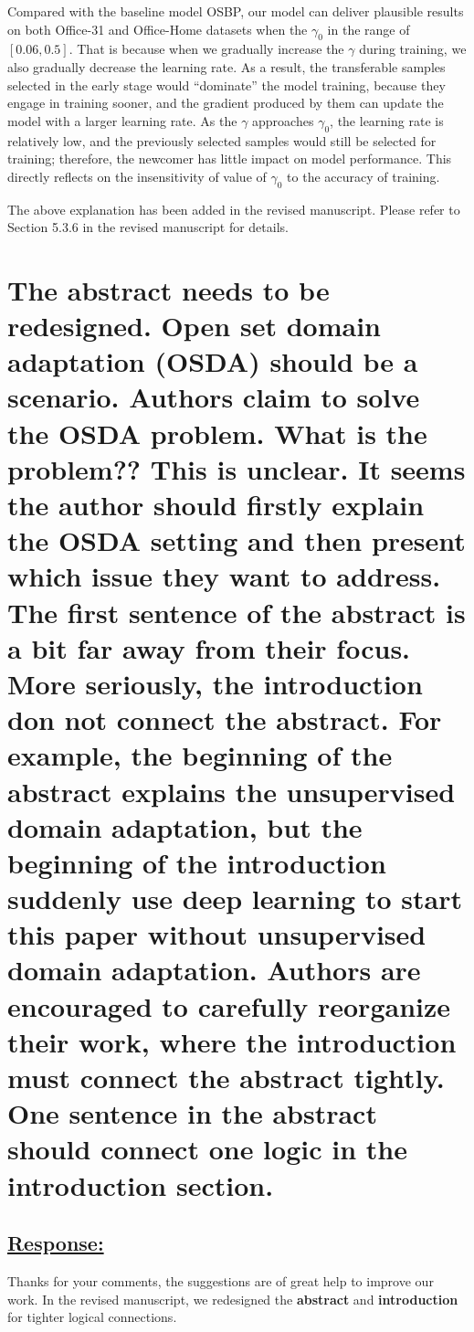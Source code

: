 Compared with the baseline model OSBP, our model can deliver plausible results on both Office-31 and Office-Home datasets when the $\gamma_0$ in the range of $[0.06, 0.5]$.
That is because when we gradually increase the $\gamma$ during training, we also gradually decrease the learning rate.
As a result, the transferable samples selected in the early stage would ``dominate'' the model training, because they engage in training sooner, and the gradient produced by them can update the model with a larger learning rate.
As the $\gamma$ approaches $\gamma_0$, the learning rate is relatively low, and the previously selected samples would still be selected for training; therefore, the newcomer has little impact on model performance.
This directly reflects on the insensitivity of value of $\gamma_0$ to the accuracy of training.

The above explanation has been added in the revised manuscript.
Please refer to Section 5.3.6 in the revised manuscript for details.


\section{The abstract needs to be redesigned.
    Open set domain adaptation (OSDA) should be a scenario.
    Authors claim to solve the OSDA problem. What is the problem?? This is unclear.
    It seems the author should firstly explain the OSDA setting and then present which issue they want to address. The first sentence of the abstract is a bit far away from their focus.
    More seriously, the introduction don not connect the abstract.
    For example, the beginning of the abstract explains the unsupervised domain adaptation, but the beginning of the introduction suddenly use deep learning to start this paper without unsupervised domain adaptation.
    Authors are encouraged to carefully reorganize their work, where the introduction must connect the abstract tightly.
    One sentence in the abstract should connect one logic in the introduction section.}
\subsection*{\underline{\textbf{Response:}}}


Thanks for your comments, the suggestions are of great help to improve our work.
In the revised manuscript, we redesigned the \textbf{abstract} and \textbf{introduction} for tighter logical connections.


